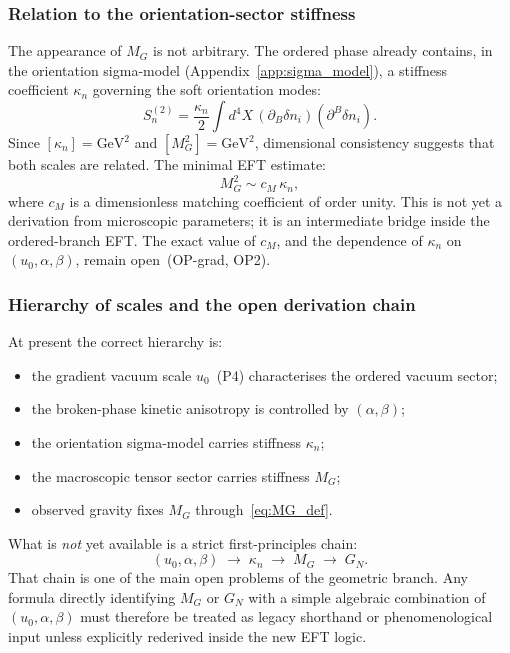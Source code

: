 \subsubsection*{Relation to the orientation-sector stiffness}

The appearance of $M_G$ is not arbitrary.
The ordered phase already contains, in the orientation sigma-model
(Appendix~\ref{app:sigma_model}), a stiffness coefficient $\kappa_n$
governing the soft orientation modes:
\begin{equation}
  \label{eq:sigma_kappa}
  S_n^{(2)}
  = \frac{\kappa_n}{2}
    \int d^4X\,(\partial_B\delta n_i)(\partial^B\delta n_i).
\end{equation}
Since $[\kappa_n]=\text{GeV}^2$ and $[M_G^2]=\text{GeV}^2$, dimensional
consistency suggests that both scales are related.
The minimal EFT estimate:
\begin{equation}
  \label{eq:MG_condensate}
  M_G^2 \sim c_M\,\kappa_n,
\end{equation}
where $c_M$ is a dimensionless matching coefficient of order unity.
This is not yet a derivation from microscopic parameters; it is an
intermediate bridge inside the ordered-branch EFT.
The exact value of $c_M$, and the dependence of $\kappa_n$ on
$(u_0,\alpha,\beta)$, remain open~(OP-grad, OP2).

\subsubsection*{Hierarchy of scales and the open derivation chain}

At present the correct hierarchy is:
\begin{itemize}
  \item the gradient vacuum scale $u_0$~(P4) characterises the ordered
    vacuum sector;
  \item the broken-phase kinetic anisotropy is controlled by
    $(\alpha,\beta)$;
  \item the orientation sigma-model carries stiffness $\kappa_n$;
  \item the macroscopic tensor sector carries stiffness $M_G$;
  \item observed gravity fixes $M_G$ through~\eqref{eq:MG_def}.
\end{itemize}
What is \emph{not} yet available is a strict first-principles chain:
\begin{equation}
  \label{eq:derivation_chain}
  (u_0,\alpha,\beta)
  \;\longrightarrow\; \kappa_n
  \;\longrightarrow\; M_G
  \;\longrightarrow\; G_N.
\end{equation}
That chain is one of the main open problems of the geometric branch.
Any formula directly identifying $M_G$ or $G_N$ with a simple algebraic
combination of $(u_0,\alpha,\beta)$ must therefore be treated as legacy
shorthand or phenomenological input unless explicitly rederived inside
the new EFT logic.

